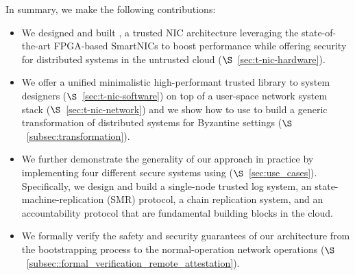 In summary, we make the following contributions:
\begin{itemize}
    \item We designed and built \projecttitle{}, a trusted NIC architecture leveraging the state-of-the-art FPGA-based SmartNICs to boost performance while offering security for distributed systems in the untrusted cloud ($\S$~\ref{sec:t-nic-hardware}). 
    \item We offer a unified minimalistic high-performant trusted library to system designers ($\S$~\ref{sec:t-nic-software}) on top of a user-space network system stack ($\S$~\ref{sec:t-nic-network}) and we show how to use \projecttitle{} to build a generic transformation of distributed systems for Byzantine settings ($\S$~\ref{subsec:transformation}).
    \item We further demonstrate the generality of our approach in practice by implementing four different secure systems using \projecttitle{} ($\S$~\ref{sec:use_cases}). Specifically, we design and build a single-node trusted log system, an state-machine-replication (SMR) protocol, a chain replication system, and an accountability protocol that are fundamental building blocks in the cloud.
    \item We formally verify the safety and security guarantees of our \projecttitle{} architecture from the bootstrapping process to the normal-operation network operations ($\S$~\ref{subsec::formal_verification_remote_attestation}).
    

\end{itemize}
